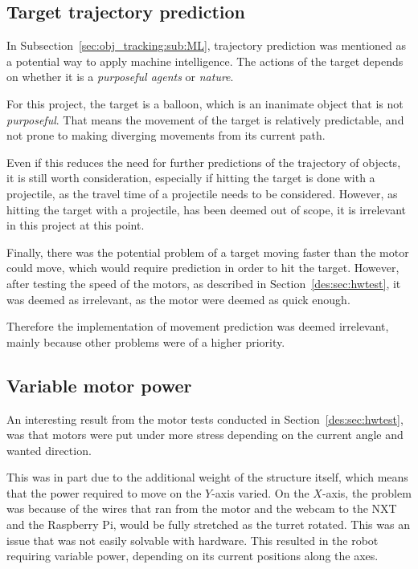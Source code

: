\subsection{Target trajectory prediction}
In Subsection~\ref{sec:obj_tracking:sub:ML}, trajectory prediction was mentioned as a potential way to apply machine intelligence.
The actions of the target depends on whether it is a \textit{purposeful agents} or \textit{nature}.

For this project, the target is a balloon, which is an inanimate object that is not \textit{purposeful}.
That means the movement of the target is relatively predictable, and not prone to making diverging movements from its current path.

Even if this reduces the need for further predictions of the trajectory of objects, it is still worth consideration, especially if hitting the target is done with a projectile, as the travel time of a projectile needs to be considered.
However, as hitting the target with a projectile, has been deemed out of scope, it is irrelevant in this project at this point.

Finally, there was the potential problem of a target moving faster than the motor could move, which would require prediction in order to hit the target.
However, after testing the speed of the motors, as described in Section~\ref{des:sec:hwtest}, it was deemed as irrelevant, as the motor were deemed as quick enough.

Therefore the implementation of movement prediction was deemed irrelevant, mainly because other problems were of a higher priority.

\subsection{Variable motor power}
An interesting result from the motor tests conducted in Section~\ref{des:sec:hwtest}, was that motors were put under more stress depending on the current angle and wanted direction.

This was in part due to the additional weight of the structure itself, which means that the power required to move on the $Y$-axis varied.
On the $X$-axis, the problem was because of the wires that ran from the motor and the webcam to the NXT and the Raspberry Pi, would be fully stretched as the turret rotated.
This was an issue that was not easily solvable with hardware.
This resulted in the robot requiring variable power, depending on its current positions along the axes.

